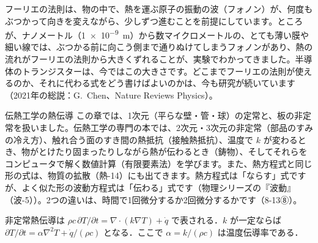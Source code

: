 \begin{phmada}
フーリエの法則は、物の中で、熱を運ぶ原子の振動の波（フォノン）が、何度もぶつかって向きを変えながら、少しずつ進むことを前提にしています。ところが、ナノメートル（\qty{1e-9}{m}）から数マイクロメートルの、とても薄い膜や細い線では、ぶつかる前に向こう側まで通りぬけてしまうフォノンがあり、熱の流れがフーリエの法則から大きくずれることが、実験でわかってきました。半導体のトランジスターは、今ではこの大きさです。どこまでフーリエの法則が使えるのか、それに代わる式をどう書けばよいのかは、今も研究が続いています（2021年の総説：G.~Chen、Nature Reviews Physics）。
\end{phmada}

\begin{phsaki}{伝熱工学の熱伝導}
この章では、1次元（平らな壁・管・球）の定常と、板の非定常を扱いました。伝熱工学の専門の本では、2次元・3次元の非定常（部品のすみの冷え方）、触れ合う面のすき間の熱抵抗（接触熱抵抗）、温度で $k$ が変わるとき、物がとけたり固まったりしながら熱が伝わるとき（鋳物）、そしてそれらをコンピュータで解く数値計算（有限要素法）を学びます。また、熱方程式と同じ形の式は、物質の拡散（熱-14）にも出てきます。熱方程式は「ならす」式ですが、よく似た形の波動方程式は「伝わる」式です（物理シリーズの『波動』（波-5））。2つの違いは、時間で1回微分するか2回微分するかです（8-13⑧）。
\end{phsaki}

\begin{senmonsho}[伝熱工学の専門書の書き方]
\begin{bkhonbun}
非定常熱伝導は $\rho c\,\partial T/\partial t=\nabla\cdot(k\nabla T)+\dot q$ で表される．$k$ が一定ならば $\partial T/\partial t=\alpha\nabla^2T+\dot q/(\rho c)$ となる．ここで $\alpha=k/(\rho c)$ は温度伝導率である．
\end{bkhonbun}
\end{senmonsho}

